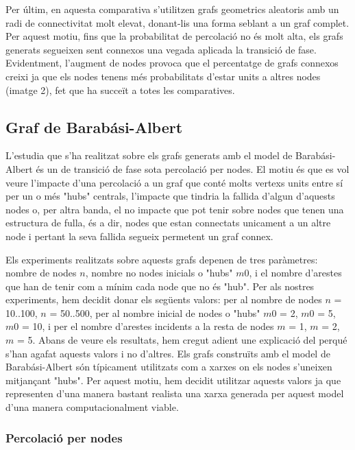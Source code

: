 \documentclass[a4paper]{article}
\begin{document}
	Per últim, en aquesta comparativa s'utilitzen grafs geometrics aleatoris amb un radi de connectivitat molt elevat, donant-lis una forma seblant a un graf complet. Per aquest motiu, fins que la probabilitat de percolació no és molt alta, els grafs generats segueixen
	sent connexos una vegada aplicada la transició de fase. Evidentment, l'augment de nodes provoca que el percentatge de grafs connexos creixi ja que els nodes tenens més probabilitats d'estar units a altres nodes (imatge 2), fet que ha succeït a totes les comparatives.
	
	\subsection{Graf de Barabási-Albert}

	L'estudia que s'ha realitzat sobre els grafs generats amb el model de Barabási-Albert és un de transició de fase sota percolació per nodes. El motiu és que es vol veure l'impacte d'una percolació a un graf que conté molts vertexs units entre sí per un o més "hubs" centrals,
	l'impacte que tindria la fallida d'algun d'aquests nodes o, per altra banda, el no impacte que pot tenir sobre nodes que tenen una estructura de fulla, és a dir, nodes que estan connectats unicament a un altre node i pertant la seva fallida segueix permetent un graf connex.

	Els experiments realitzats sobre aquests grafs depenen de tres paràmetres: nombre de nodes $n$, nombre no nodes inicials o "hubs" $m0$, i el nombre d'arestes que han de tenir com a mínim cada node que no és "hub". Per als nostres experiments, hem decidit donar els següents valors: per al nombre de nodes $n$ = 10..100, $n$ = 50..500, per al nombre inicial
	de nodes o "hubs" $m0$ = 2, $m0$ = 5, $m0$ = 10, i per el nombre d'arestes incidents a la resta de nodes $m$ = 1, $m$ = 2, $m$ = 5. Abans de veure els resultats, hem cregut adient une explicació del perqué s'han agafat aquests valors i no d'altres. Els grafs construïts amb el model de Barabási-Albert són típicament utilitzats com a xarxes on els nodes s'uneixen
	mitjançant "hubs". Per aquest motiu, hem decidit utilitzar aquests valors ja que representen d'una manera bastant realista una xarxa generada per aquest model d'una manera computacionalment viable.

	\subsubsection{Percolació per nodes}
\end{document}
